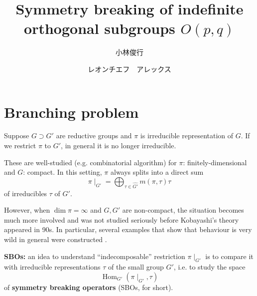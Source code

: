 \documentclass[12pt]{article} %
\newcommand{\tmop}[1]{\ensuremath{\operatorname{#1}}}
\theoremstyle{definition}
\theoremstyle{exampstyle} \newtheorem{examp}[theorem]{Theorem}
\begin{document}
\title{Symmetry breaking of indefinite orthogonal subgroups $O(p,q)$}

  \author{小林俊行}
  \author{レオンチエフ　アレックス}




  \maketitle
\section{Branching problem}

Suppose $G \supset G'$ are reductive groups and $\pi$ is irreducible
representation of $G$. If we restrict $\pi$ to $G'$, in general it is no
longer irreducible.\\
\begin{figure}[H]
	\xymatrixrowsep{0.2pt}
	\xymatrixcolsep{0.5cm}
	\centering
	\hspace{2.8cm}
\end{figure}
\begin{center}
\end{center}
These are well-studied (e.g. combinatorial algorithm) for $\pi$:
finitely-dimensional and $G$: compact. In this setting, $\pi$ always splits
into a direct sum
\[ \pi\!\mid_{G'} = \bigoplus_{\tau \in \widehat{G'}} m (\pi, \tau) \tau \]
of irreducibles $\tau$ of $G'$.

However, when $\dim\pi = \infty$ and $G, G'$ are non-compact, the situation
becomes much more involved and was not studied seriously before Kobayashi's
theory appeared in 90s. In particular, several examples that show that
behaviour is very wild in general were constructed {\cite{Kobayashi2008}}.

{\textbf{SBOs:}} an idea to understand ``indecomposable'' restriction $\pi\!
\mid_{G'}$ is to compare it with irreducible representations $\tau$ of the
small group $G'$, i.e. to study the space
\[ \tmop{Hom}_{G'} (\pi\!\mid_{G'}, \tau) \]
of {\textbf{symmetry breaking operators}} (SBOs, for short).
\end{document}
